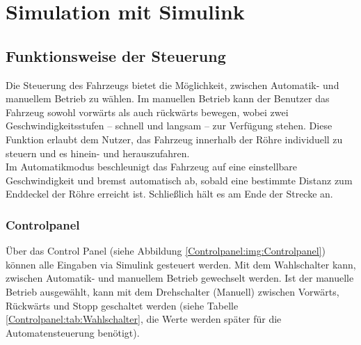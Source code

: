 \newpage






\newpage
\section{Simulation mit Simulink}
\label{section:Simulation}



\subsection{Funktionsweise der Steuerung}
\label{Steuerung}

Die Steuerung des Fahrzeugs bietet die Möglichkeit, zwischen Automatik- und manuellem Betrieb zu wählen. Im manuellen Betrieb kann der Benutzer das Fahrzeug sowohl vorwärts als auch rückwärts bewegen, wobei zwei Geschwindigkeitsstufen – schnell und langsam – zur Verfügung stehen. Diese Funktion erlaubt dem Nutzer, das Fahrzeug innerhalb der Röhre individuell zu steuern und es hinein- und herauszufahren.\\
Im Automatikmodus beschleunigt das Fahrzeug auf eine einstellbare Geschwindigkeit und bremst automatisch ab, sobald eine bestimmte Distanz zum Enddeckel der Röhre erreicht ist. Schließlich hält es am Ende der Strecke an.\\

\subsubsection{Controlpanel}
\label{Steuerung:Controlpanel}
Über das Control Panel (siehe Abbildung \ref{Controlpanel:img:Controlpanel}) können alle Eingaben via Simulink gesteuert werden. Mit dem Wahlschalter kann, zwischen Automatik- und manuellem Betrieb gewechselt werden. Ist der manuelle Betrieb ausgewählt, kann mit dem Drehschalter (Manuell) zwischen Vorwärts, Rückwärts und Stopp geschaltet werden (siehe Tabelle \ref{Controlpanel:tab:Wahlschalter}, die Werte werden später für die Automatensteuerung benötigt).\\


